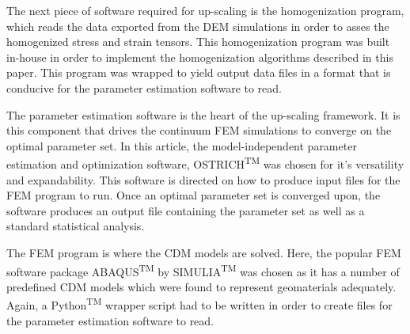The next piece of software required for up-scaling is the homogenization program, which reads the data exported from the DEM simulations in order to asses the homogenized stress and strain tensors. This homogenization program was built in-house in order to implement the homogenization algorithms described in this paper. This program was wrapped to yield output data files in a format that is conducive for the parameter estimation software to read. 

The parameter estimation software is the heart of the up-scaling framework. It is this component that drives the continuum FEM simulations to converge on the optimal parameter set. In this article, the model-independent parameter estimation and optimization software, OSTRICH\textsuperscript{TM} was chosen for it's versatility and expandability. This software is directed on how to produce input files for the FEM program to run. Once an optimal parameter set is converged upon, the software produces an output file containing the parameter set as well as a standard statistical analysis.

The FEM program is where the CDM models are solved. Here, the popular FEM software package ABAQUS\textsuperscript{TM} by SIMULIA\textsuperscript{TM} was chosen as it has a number of predefined CDM models which were found to represent geomaterials adequately. Again, a Python\textsuperscript{TM} wrapper script had to be written in order to create files for the parameter estimation software to read. 
